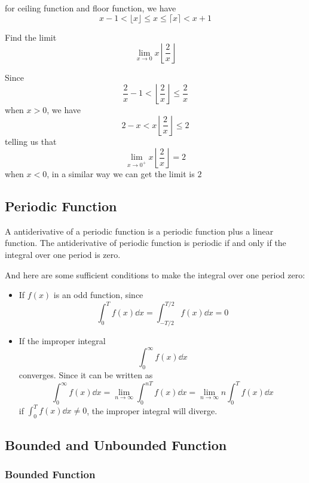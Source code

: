 \documentclass{overview}
\begin{document}
for ceiling function and floor function, we have
\[x-1 < \lfloor x \rfloor \leq x \leq \lceil x \rceil < x+1\]
\begin{example}
	Find the limit
	\[
		\lim_{x \to 0} x \left\lfloor \dfrac{2}{x} \right\rfloor
	\] 
	\begin{answer}
		Since
		\[
			\dfrac{2}{x} - 1 < \left\lfloor \dfrac{2}{x} \right\rfloor \leq \dfrac{2}{x}
		\] 
		when $x>0$, we have
		 \[
			2 - x < x \left\lfloor \dfrac{2}{x} \right\rfloor \leq 2
		\] 
		telling us that
		\[
			\lim_{x \to 0^+} x \left\lfloor \dfrac{2}{x} \right\rfloor = 2
		\]
		when $x<0$, in a similar way we can get the limit is $2$
	\end{answer}
\end{example}

\subsection{Periodic Function}
A antiderivative of a periodic function is a periodic function plus a linear function.
The antiderivative of periodic function is periodic if and only if the integral over
one period is zero.

And here are some sufficient conditions to make the integral over one period zero:
\begin{itemize}
	\item If $f(x)$ is an odd function, since
		\[
			\int_0^T f(x)\dd x=\int_{-T/2}^{T/2} f(x)\dd x=0
		\] 
	\item If the improper integral
		\[
			\int_0^\infty f(x)\dd x
		\] 
		converges. Since it can be written as
		\[
			\int_0^\infty f(x)\dd x = \lim_{n \to \infty} \int_0^{nT} f(x)\dd x = \lim_{n \to \infty} n \int_0^T f(x)\dd x
		\] 
		if $\int_0^T f(x)\dd x \neq 0$, the improper integral will diverge.

\end{itemize}

\subsection{Bounded and Unbounded Function}
\subsubsection{Bounded Function}
\end{document}

